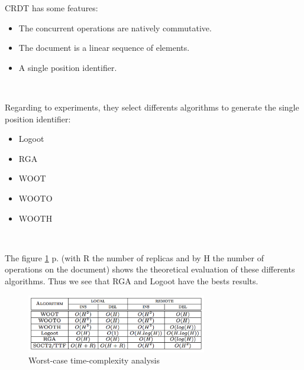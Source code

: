 CRDT has some features:
\begin{itemize}
	\item The concurrent operations are natively commutative.
	\item The document is a linear sequence of elements.
	\item A single position identifier.
\end{itemize}~

Regarding to experiments, they select differents algorithms to generate the single position identifier:
\begin{itemize}
	\item Logoot
	\item RGA
	\item WOOT
	\item WOOTO
	\item WOOTH
\end{itemize}~

The figure \ref{fig:worst} p.\pageref{fig:worst} (with R the number of replicas and by H the number of operations on the document) shows the theoretical evaluation of these differents algorithms. Thus we see that RGA and Logoot have the bests results.

\begin{figure}[h]
  \center
  \includegraphics[width=0.7\textwidth]{includes/worst.png}
  \caption{Worst-case time-complexity analysis}
  \label{fig:worst}
\end{figure}